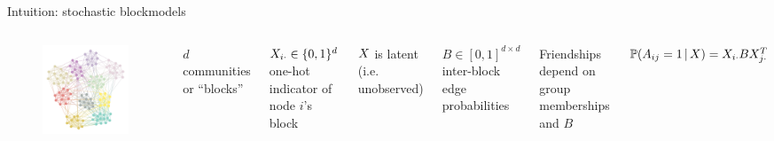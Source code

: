 \documentclass[aspectratio=169]{beamer}
\theoremstyle{remark}
\begin{document}
\begin{frame}{Intuition: stochastic blockmodels}

    \begin{columns}

        \begin{figure}
            \includegraphics[width=\textwidth]{figures/assortative.png}
        \end{figure}


        $d$ communities or ``blocks''

        $X_{i \cdot} \in \{0, 1\}^d$ one-hot indicator of node $i$'s block

        \vspace{4mm}

        $X$ is latent (i.e. unobserved)

        \vspace{4mm}

        $B \in [0, 1]^{d \times d}$ inter-block edge probabilities

        \vspace{4mm}

        Friendships depend on group memberships and $B$

        $\P[\X]{A_{ij} = 1} = \X_{i \cdot} B \X_{j \cdot}^T$

    \end{columns}

\end{frame}
\end{document}

